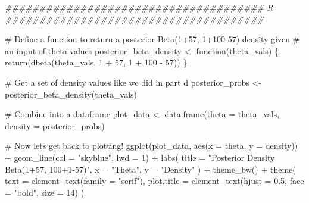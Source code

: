 \documentclass[
  letterpaper,
  DIV=11,
  numbers=noendperiod]{scrartcl}
\newenvironment{Shaded}{\begin{snugshade}}{\end{snugshade}}
\newcommand{\AttributeTok}[1]{\textcolor[rgb]{0.40,0.45,0.13}{#1}}
\newcommand{\CommentTok}[1]{\textcolor[rgb]{0.37,0.37,0.37}{#1}}
\newcommand{\ControlFlowTok}[1]{\textcolor[rgb]{0.00,0.23,0.31}{#1}}
\newcommand{\DecValTok}[1]{\textcolor[rgb]{0.68,0.00,0.00}{#1}}
\newcommand{\DocumentationTok}[1]{\textcolor[rgb]{0.37,0.37,0.37}{\textit{#1}}}
\newcommand{\FloatTok}[1]{\textcolor[rgb]{0.68,0.00,0.00}{#1}}
\newcommand{\FunctionTok}[1]{\textcolor[rgb]{0.28,0.35,0.67}{#1}}
\newcommand{\NormalTok}[1]{\textcolor[rgb]{0.00,0.23,0.31}{#1}}
\newcommand{\OtherTok}[1]{\textcolor[rgb]{0.00,0.23,0.31}{#1}}
\newcommand{\SpecialCharTok}[1]{\textcolor[rgb]{0.37,0.37,0.37}{#1}}
\newcommand{\StringTok}[1]{\textcolor[rgb]{0.13,0.47,0.30}{#1}}
\begin{document}
\begin{Shaded}
\begin{Highlighting}[]
\DocumentationTok{\#\#\#\#\#\#\#\#\#\#\#\#\#\#\#\#\#\#\#\#\#\#\#\#\#\#\#\#\#\#\#\#\#\#\#\#\#\# R \#\#\#\#\#\#\#\#\#\#\#\#\#\#\#\#\#\#\#\#\#\#\#\#\#\#\#\#\#\#\#\#\#\#\#\#\#\#}

\CommentTok{\# Define a function to return a posterior Beta(1+57, 1+100{-}57) density given}
\CommentTok{\# an input of theta values}
\NormalTok{posterior\_beta\_density }\OtherTok{\textless{}{-}} \ControlFlowTok{function}\NormalTok{(theta\_vals) \{}
    \FunctionTok{return}\NormalTok{(}\FunctionTok{dbeta}\NormalTok{(theta\_vals, }\DecValTok{1} \SpecialCharTok{+} \DecValTok{57}\NormalTok{, }\DecValTok{1} \SpecialCharTok{+} \DecValTok{100} \SpecialCharTok{{-}} \DecValTok{57}\NormalTok{))}
\NormalTok{\}}

\CommentTok{\# Get a set of density values like we did in part d}
\NormalTok{posterior\_probs }\OtherTok{\textless{}{-}} \FunctionTok{posterior\_beta\_density}\NormalTok{(theta\_vals)}

\CommentTok{\# Combine into a dataframe}
\NormalTok{plot\_data }\OtherTok{\textless{}{-}} \FunctionTok{data.frame}\NormalTok{(}\AttributeTok{theta =}\NormalTok{ theta\_vals, }\AttributeTok{density =}\NormalTok{ posterior\_probs)}

\CommentTok{\# Now let\textquotesingle{}s get back to plotting!}
\FunctionTok{ggplot}\NormalTok{(plot\_data, }\FunctionTok{aes}\NormalTok{(}\AttributeTok{x =}\NormalTok{ theta, }\AttributeTok{y =}\NormalTok{ density)) }\SpecialCharTok{+}
    \FunctionTok{geom\_line}\NormalTok{(}\AttributeTok{col =} \StringTok{"skyblue"}\NormalTok{, }\AttributeTok{lwd =} \DecValTok{1}\NormalTok{) }\SpecialCharTok{+}
    \FunctionTok{labs}\NormalTok{(}
        \AttributeTok{title =} \StringTok{"Posterior Density Beta(1+57, 100+1{-}57)"}\NormalTok{,}
        \AttributeTok{x =} \StringTok{"Theta"}\NormalTok{, }\AttributeTok{y =} \StringTok{"Density"}
\NormalTok{    ) }\SpecialCharTok{+}
    \FunctionTok{theme\_bw}\NormalTok{() }\SpecialCharTok{+}
    \FunctionTok{theme}\NormalTok{(}
        \AttributeTok{text =} \FunctionTok{element\_text}\NormalTok{(}\AttributeTok{family =} \StringTok{"serif"}\NormalTok{),}
        \AttributeTok{plot.title =} \FunctionTok{element\_text}\NormalTok{(}\AttributeTok{hjust =} \FloatTok{0.5}\NormalTok{, }\AttributeTok{face =} \StringTok{"bold"}\NormalTok{, }\AttributeTok{size =} \DecValTok{14}\NormalTok{)}
\NormalTok{    )}
\end{Highlighting}
\end{Shaded}
\end{document}

